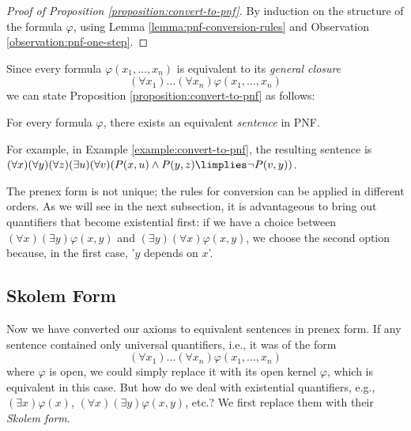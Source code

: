 \begin{proof}[Proof of Proposition \ref{proposition:convert-to-pnf}]
    By induction on the structure of the formula $\varphi$, using Lemma \ref{lemma:pnf-conversion-rules} and Observation \ref{observation:pnf-one-step}.
\end{proof}

Since every formula $\varphi(x_1,\dots,x_n)$ is equivalent to its \emph{general closure} $$(\forall x_1)\dots(\forall x_n)\varphi(x_1,\dots,x_n)$$ we can state Proposition \ref{proposition:convert-to-pnf} as follows:

\begin{corollary}
    For every formula $\varphi$, there exists an equivalent \emph{sentence} in PNF.
\end{corollary} 

For example, in Example \ref{example:convert-to-pnf}, the resulting sentence is $(\forall x)(\forall y)(\forall z)(\exists u)(\forall v)( P(x,u)\land P(y,z)\limplies\neg P(v,y))$.

\begin{remark}
    The prenex form is not unique; the rules for conversion can be applied in different orders. As we will see in the next subsection, it is advantageous to bring out quantifiers that become existential first: if we have a choice between $(\forall x)(\exists y)\varphi(x,y)$ and $(\exists y)(\forall x)\varphi(x,y)$, we choose the second option because, in the first case, '$y$ depends on $x$'.
\end{remark}

\subsection{Skolem Form}

Now we have converted our axioms to equivalent sentences in prenex form. If any sentence contained only universal quantifiers, i.e., it was of the form 
$$(\forall x_1)\dots(\forall x_n)\varphi(x_1,\dots,x_n)$$ 
where $\varphi$ is open, we could simply replace it with its open kernel $\varphi$, which is equivalent in this case. But how do we deal with existential quantifiers, e.g., $(\exists x)\varphi(x)$, $(\forall x)(\exists y)\varphi(x,y)$, etc.? We first replace them with their \emph{Skolem form}.

